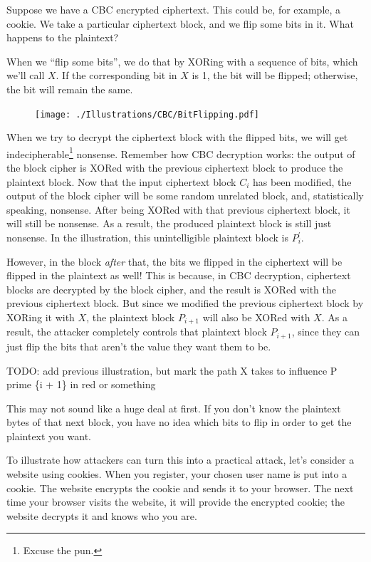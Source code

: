 \documentclass[11pt,ebook,table,dvipsnames]{memoir}
\begin{document}
Suppose we have a CBC encrypted ciphertext. This could be, for
example, a cookie. We take a particular ciphertext block, and we flip
some bits in it. What happens to the plaintext?

When we \enquote{flip some bits}, we do that by XORing with a sequence of
bits, which we'll call $X$. If the corresponding bit in $X$ is 1, the
bit will be flipped; otherwise, the bit will remain the same.

\begin{figure}[h!]
\centering
\texttt{[image: ./Illustrations/CBC/BitFlipping.pdf]}
\end{figure}

When we try to decrypt the ciphertext block with the flipped bits, we
will get indecipherable\footnote{Excuse the pun.} nonsense. Remember how
CBC decryption works: the output of the block cipher is XORed with the
previous ciphertext block to produce the plaintext block. Now that the
input ciphertext block $C_i$ has been modified, the output of the
block cipher will be some random unrelated block, and, statistically
speaking, nonsense. After being XORed with that previous ciphertext
block, it will still be nonsense. As a result, the produced plaintext
block is still just nonsense. In the illustration, this unintelligible
plaintext block is $P_i^{\prime}$.

However, in the block \emph{after} that, the bits we flipped in the
ciphertext will be flipped in the plaintext as well! This is because,
in CBC decryption, ciphertext blocks are decrypted by the block
cipher, and the result is XORed with the previous ciphertext block.
But since we modified the previous ciphertext block by XORing it with
$X$, the plaintext block $P_{i + 1}$ will also be XORed with $X$. As a
result, the attacker completely controls that plaintext block
$P_{i + 1}$, since they can just flip the bits that aren't the value
they want them to be.

TODO: add previous illustration, but mark the path X takes to
influence P prime \{i + 1\} in red or something

This may not sound like a huge deal at first. If you don't know the
plaintext bytes of that next block, you have no idea which bits to
flip in order to get the plaintext you want.

To illustrate how attackers can turn this into a practical attack,
let's consider a website using cookies. When you register, your chosen
user name is put into a cookie. The website encrypts the cookie and
sends it to your browser. The next time your browser visits the
website, it will provide the encrypted cookie; the website decrypts it
and knows who you are.
\end{document}
